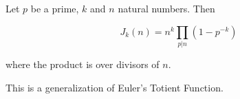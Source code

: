 \documentclass[12pt]{article}
\begin{document}
Let $p$ be a prime, $k$ and $n$ natural numbers.  Then

$$
  J_k(n) = n^k \prod_{p|n} ( 1-p^{-k})
$$

where the product is over divisors of $n$. 

This is a generalization of Euler's Totient Function.
\end{document}
